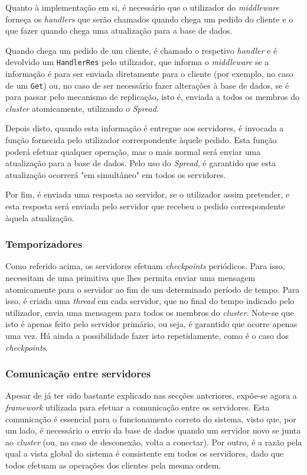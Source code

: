 \documentclass[a4paper]{report}
\begin{document}
{				Quanto à implementação em si, é necessário que o utilizador do \textit{middleware} forneça os \textit{handlers} que serão chamados quando chega um pedido do cliente e o que fazer quando chega uma atualização para a base de dados. 
				
				Quando chega um pedido de um cliente, é chamado o respetivo \textit{handler} e é devolvido um \texttt{HandlerRes} pelo utilizador, que informa o \textit{middleware} se a informação é para ser enviada diretamente para o cliente (por exemplo, no caso de um \texttt{Get}) ou, no caso de ser necessário fazer alterações à base de dados, se é para passar pelo mecanismo de replicação, isto é, enviada a todos os membros do \textit{cluster} atomicamente, utilizando o \textit{Spread}.
				
				Depois disto, quando esta informação é entregue aos servidores, é invocada a função fornecida pelo utilizador correspondente àquele pedido. Esta função poderá efetuar qualquer operação, mas o mais normal será enviar uma atualização para a base de dados. Pelo uso do \textit{Spread}, é garantido que esta atualização ocorrerá "em simultâneo" em todos os servidores.
				
				Por fim, é enviada uma resposta ao servidor, se o utilizador assim pretender, e esta resposta será enviada pelo servidor que recebeu o pedido correspondente àquela atualização.

			\subsubsection{Temporizadores} \label{sssec:Timers}
				Como referido acima, os servidores efetuam \textit{checkpoints} periódicos. Para isso, necessitam de uma primitiva que lhes permita enviar uma mensagem atomicamente para o servidor ao fim de um determinado período de tempo. Para isso, é criada uma \textit{thread} em cada servidor, que no final do tempo indicado pelo utilizador, envia uma mensagem para todos os membros do \textit{cluster}. Note-se que isto é apenas feito pelo servidor primário, ou seja, é garantido que ocorre apenas uma vez. Há ainda a possibilidade fazer isto repetidamente, como é o caso dos \textit{checkpoints}.

			\subsubsection{Comunicação entre servidores} \label{sssec:ServerCommunication}
				Apesar de já ter sido bastante explicado nas secções anteriores, expõe-se agora a \textit{framework} utilizada para efetuar a comunicação entre os servidores. Esta comunicação é essencial para o funcionamento correto do sistema, visto que, por um lado, é necessário o envio da base de dados quando um servidor novo se junta ao \textit{cluster} (ou, no caso de desconexão, volta a conectar). Por outro, é a razão pela qual a vista global do sistema é consistente em todos os servidores, dado que todos efetuam as operações dos clientes pela mesma ordem.
				
}
\end{document}
